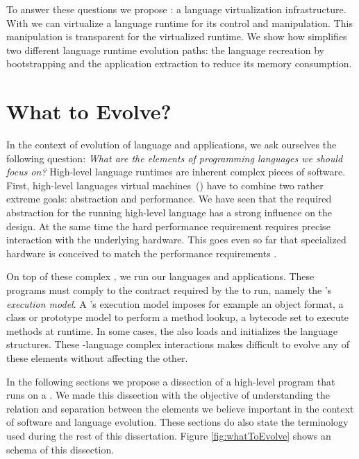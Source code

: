 To answer these questions we propose \Vtt: a language virtualization infrastructure. With \Vtt we can virtualize a language runtime for its control and manipulation. This manipulation is transparent for the virtualized runtime. We show how \Vtt simplifies two different language runtime evolution paths: the language recreation by bootstrapping and the application extraction to reduce its memory consumption.

\section{What to Evolve?}

In the context of evolution of language and applications, we ask ourselves the following question: \emph{What are the elements of programming languages we should focus on?} High-level language runtimes are inherent complex pieces of software.
First, high-level languages virtual machines~(\VMs) have to combine two rather extreme goals: abstraction and performance.
We have seen that the required abstraction for the running high-level language has a strong influence on the \VM design.
At the same time the hard performance requirement requires precise interaction with the underlying hardware.
This goes even so far that specialized hardware is conceived to match the performance requirements \cite{Unga84a,Stef84a,McGh98a,Clic05a}.


On top of these complex \VMs, we run our  languages and applications.
These programs must comply to the contract required by the \VM to run, namely the \VM's \emph{execution model}.
A \VM's execution model imposes for example an object format, a class or prototype model to perform a method lookup, a bytecode set to execute methods at runtime.
In some cases, the \VM also loads and initializes the language structures.
These \VM-language complex interactions makes difficult to evolve any of these elements without affecting the other.

In the following sections we propose a dissection of a high-level program that runs on a \VM. We made this dissection with the objective of understanding the relation and separation between the elements we believe important in the context of software and language evolution. These sections do also state the terminology used during the rest of this dissertation. Figure \ref{fig:whatToEvolve} shows an schema of this dissection.


